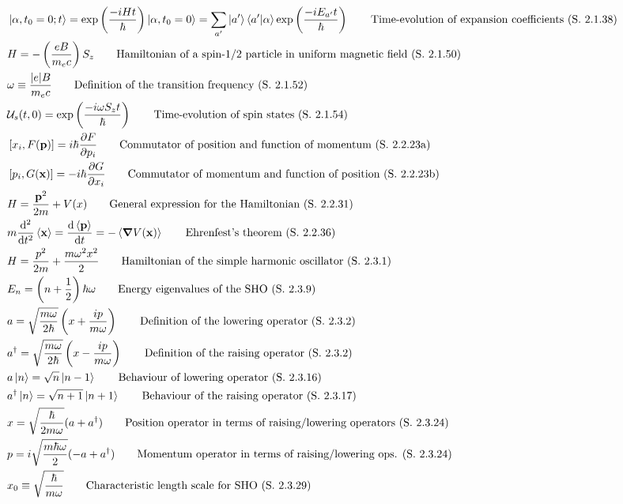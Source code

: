 \documentclass[10pt]{article}
\newcommand{\ve}[1]{\boldsymbol{\mathbf{#1}}}
\newcommand{\tder}[2]{\frac{\dd #1}{\dd #2}}
\newcommand{\pder}[2]{\frac{\partial #1}{\partial #2}}
\newcommand{\dtder}[2]{\frac{\dd^2 #1}{\dd #2^2}}
\newcommand{\lrp}[1]{\left( #1 \right)}
\newcommand{\lrb}[1]{\left[ #1 \right]}
\newcommand{\herm}[1]{#1^\dagger}
\begin{document}
\begin{multicols}{2}
\begin{align*}
		& \ket{\alpha,t_0 =0;t} = \exp \lrp{\frac{-iHt}{\hbar}} \ket{\alpha,t_0=0} = \sum_{a'} \ket{a'} \braket{a'}{\alpha} \exp\lrp{\frac{-i E_{a'} t}{\hbar}}	\tag*{Time-evolution of expansion coefficients (S. 2.1.38)} \\
		& H = - \lrp{\frac{e B}{m_e c}} S_z	\tag*{Hamiltonian of a spin-1/2 particle in uniform magnetic field (S. 2.1.50)} \\
		& \omega \equiv \frac{|e| B}{m_e c}	\tag*{Definition of the transition frequency (S. 2.1.52)} \\
		& \mathcal{U}_s (t,0) = \exp \lrp{\frac{-i\omega S_z t}{\hbar}}		\tag*{Time-evolution of spin states (S. 2.1.54)} \\	
		& \lrb{x_i,F(\ve{p})} = i \hbar \pder{F}{p_i}	\tag*{Commutator of position and function of momentum (S. 2.2.23a)} \\
		& \lrb{p_i, G(\ve{x})} = -i \hbar \pder{G}{x_i}	\tag*{Commutator of momentum and function of position (S. 2.2.23b)} \\
		& H = \frac{\ve{p}^2}{2m} + V(x)	\tag*{General expression for the Hamiltonian (S. 2.2.31)} \\
		& m \dtder{}{t} \expval{\ve{x}} = \tder{\expval{\ve{p}}}{t} = - \expval{\ve{\nabla} V (\ve{x})}	\tag*{Ehrenfest's theorem (S. 2.2.36)} \\
		& H = \frac{p^2}{2m} + \frac{m \omega^2 x^2}{2}		\tag*{Hamiltonian of the simple harmonic oscillator (S. 2.3.1)} \\
		& E_n = \lrp{n + \frac{1}{2}} \hbar \omega	\tag*{Energy eigenvalues of the SHO	(S. 2.3.9)} \\
		& a = \sqrt{\frac{m \omega}{2 \hbar}} \lrp{x + \frac{ip}{m \omega}}	\tag*{Definition of the lowering operator (S. 2.3.2)}\\
		& \herm{a} = \sqrt{\frac{m \omega}{2 \hbar}} \lrp{x - \frac{i p}{m \omega}}	\tag*{Definition of the raising operator (S. 2.3.2)} \\
		& a \ket{n} = \sqrt{n} \ket{n-1}	\tag*{Behaviour of lowering operator (S. 2.3.16)} \\
		& \herm{a} \ket{n} = \sqrt{n+1} \ket{n+1}	\tag*{Behaviour of the raising operator (S. 2.3.17)} \\
		& x = \sqrt{\frac{\hbar}{2 m \omega}} (a+ \herm{a})	\tag*{Position operator in terms of raising/lowering operators (S. 2.3.24)} \\
		& p =i \sqrt{\frac{m \hbar \omega}{2}}(-a + \herm{a})	\tag*{Momentum operator in terms of raising/lowering ops. (S. 2.3.24)} \\
		& x_0 \equiv \sqrt{\frac{\hbar}{m \omega}}	\tag*{Characteristic length scale for SHO (S. 2.3.29)} \\

\end{align*}
\end{multicols}
\end{document}
